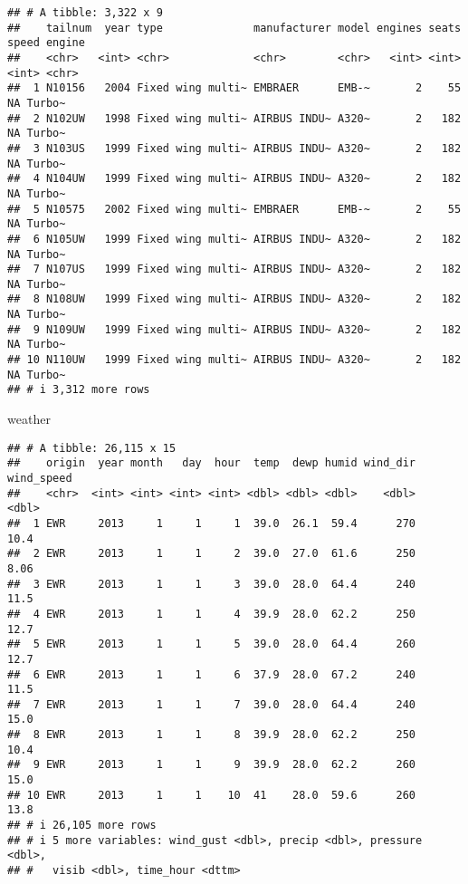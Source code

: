 \documentclass[
]{article}
\newenvironment{Shaded}{\begin{snugshade}}{\end{snugshade}}
\newcommand{\NormalTok}[1]{#1}
\begin{document}
\begin{verbatim}
## # A tibble: 3,322 x 9
##    tailnum  year type              manufacturer model engines seats speed engine
##    <chr>   <int> <chr>             <chr>        <chr>   <int> <int> <int> <chr> 
##  1 N10156   2004 Fixed wing multi~ EMBRAER      EMB-~       2    55    NA Turbo~
##  2 N102UW   1998 Fixed wing multi~ AIRBUS INDU~ A320~       2   182    NA Turbo~
##  3 N103US   1999 Fixed wing multi~ AIRBUS INDU~ A320~       2   182    NA Turbo~
##  4 N104UW   1999 Fixed wing multi~ AIRBUS INDU~ A320~       2   182    NA Turbo~
##  5 N10575   2002 Fixed wing multi~ EMBRAER      EMB-~       2    55    NA Turbo~
##  6 N105UW   1999 Fixed wing multi~ AIRBUS INDU~ A320~       2   182    NA Turbo~
##  7 N107US   1999 Fixed wing multi~ AIRBUS INDU~ A320~       2   182    NA Turbo~
##  8 N108UW   1999 Fixed wing multi~ AIRBUS INDU~ A320~       2   182    NA Turbo~
##  9 N109UW   1999 Fixed wing multi~ AIRBUS INDU~ A320~       2   182    NA Turbo~
## 10 N110UW   1999 Fixed wing multi~ AIRBUS INDU~ A320~       2   182    NA Turbo~
## # i 3,312 more rows
\end{verbatim}

\begin{Shaded}
\begin{Highlighting}[]
\NormalTok{weather}
\end{Highlighting}
\end{Shaded}

\begin{verbatim}
## # A tibble: 26,115 x 15
##    origin  year month   day  hour  temp  dewp humid wind_dir wind_speed
##    <chr>  <int> <int> <int> <int> <dbl> <dbl> <dbl>    <dbl>      <dbl>
##  1 EWR     2013     1     1     1  39.0  26.1  59.4      270      10.4 
##  2 EWR     2013     1     1     2  39.0  27.0  61.6      250       8.06
##  3 EWR     2013     1     1     3  39.0  28.0  64.4      240      11.5 
##  4 EWR     2013     1     1     4  39.9  28.0  62.2      250      12.7 
##  5 EWR     2013     1     1     5  39.0  28.0  64.4      260      12.7 
##  6 EWR     2013     1     1     6  37.9  28.0  67.2      240      11.5 
##  7 EWR     2013     1     1     7  39.0  28.0  64.4      240      15.0 
##  8 EWR     2013     1     1     8  39.9  28.0  62.2      250      10.4 
##  9 EWR     2013     1     1     9  39.9  28.0  62.2      260      15.0 
## 10 EWR     2013     1     1    10  41    28.0  59.6      260      13.8 
## # i 26,105 more rows
## # i 5 more variables: wind_gust <dbl>, precip <dbl>, pressure <dbl>,
## #   visib <dbl>, time_hour <dttm>
\end{verbatim}
\end{document}
